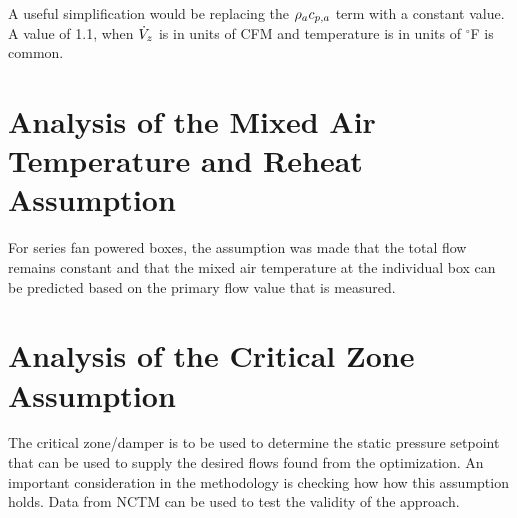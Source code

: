A useful simplification would be replacing the \(\rho_a c_{p,a}{}\) term with a constant value. A value of 1.1, when \(\dot{V}_{z}\) is in units of CFM and temperature is in units of \(^\circ\)F is common. 

\section{Analysis of the Mixed Air Temperature and Reheat Assumption}

For series fan powered boxes, the assumption was made that the total flow remains constant and that the mixed air temperature at the individual box can be predicted based on the primary flow value that is measured. 


\section{Analysis of the Critical Zone Assumption}

The critical zone/damper is to be used to determine the static pressure setpoint that can be used to supply the desired flows found from the optimization. An important consideration in the methodology is checking how how this assumption holds. Data from NCTM can be used to test the validity of the approach.

